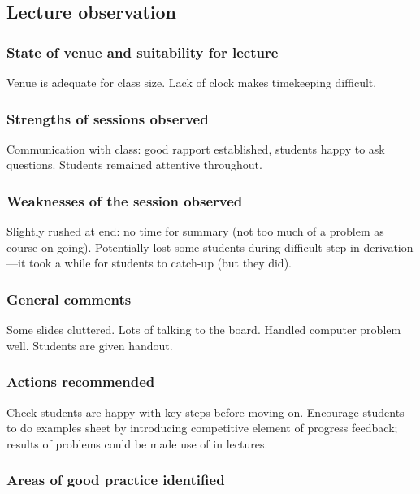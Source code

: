 \subsection{Lecture observation}\label{sec:other-lecture}

\subsubsection{State of venue and suitability for lecture}

Venue is adequate for class size. Lack of clock makes timekeeping difficult.

\subsubsection{Strengths of sessions observed}

Communication with class: good rapport established, students happy to ask questions. Students remained attentive throughout.

\subsubsection{Weaknesses of the session observed}

Slightly rushed at end: no time for summary (not too much of a problem as course on-going). Potentially lost some students during difficult step in derivation---it took a while for students to catch-up (but they did).

\subsubsection{General comments}

Some slides cluttered. Lots of talking to the board. Handled computer problem well. Students are given handout.

\subsubsection{Actions recommended}\label{sec:other-lecture-actions}

Check students are happy with key steps before moving on. Encourage students to do examples sheet by introducing competitive element of progress feedback; results of problems could be made use of in lectures.

\subsubsection{Areas of good practice identified}\label{sec:other-lecture-practice}

